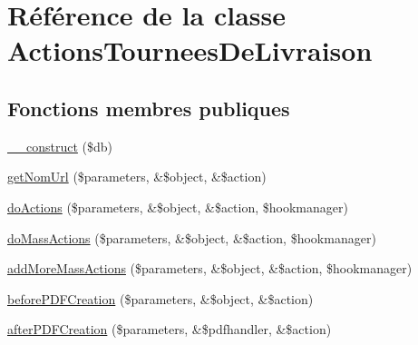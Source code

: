 \hypertarget{classActionsTourneesDeLivraison}{}\section{Référence de la classe Actions\+Tournees\+De\+Livraison}
\label{classActionsTourneesDeLivraison}
\subsection*{Fonctions membres publiques}
\begin{DoxyCompactItemize}
\item 
\hyperlink{classActionsTourneesDeLivraison_a5fbe4d847f23e5d9f235c0bbae53c3a8}{\+\_\+\+\_\+construct} (\$db)
\item 
\hyperlink{classActionsTourneesDeLivraison_a544a9457fe6a60b0b7901962d589ed21}{get\+Nom\+Url} (\$parameters, \&\$object, \&\$action)
\item 
\hyperlink{classActionsTourneesDeLivraison_a50689a0e292dc23ca42fff8346b5a8ad}{do\+Actions} (\$parameters, \&\$object, \&\$action, \$hookmanager)
\item 
\hyperlink{classActionsTourneesDeLivraison_ab6e65ac3262c6dc5a5e30f2a923d0b58}{do\+Mass\+Actions} (\$parameters, \&\$object, \&\$action, \$hookmanager)
\item 
\hyperlink{classActionsTourneesDeLivraison_a7f0fd405519702bdfa23b07f86c6e3ab}{add\+More\+Mass\+Actions} (\$parameters, \&\$object, \&\$action, \$hookmanager)
\item 
\hyperlink{classActionsTourneesDeLivraison_a22ab94f9a90edae05b64ea3657754227}{before\+P\+D\+F\+Creation} (\$parameters, \&\$object, \&\$action)
\item 
\hyperlink{classActionsTourneesDeLivraison_a028b0acc4c7801e2eacd08ef12d713b3}{after\+P\+D\+F\+Creation} (\$parameters, \&\$pdfhandler, \&\$action)
\end{DoxyCompactItemize}
